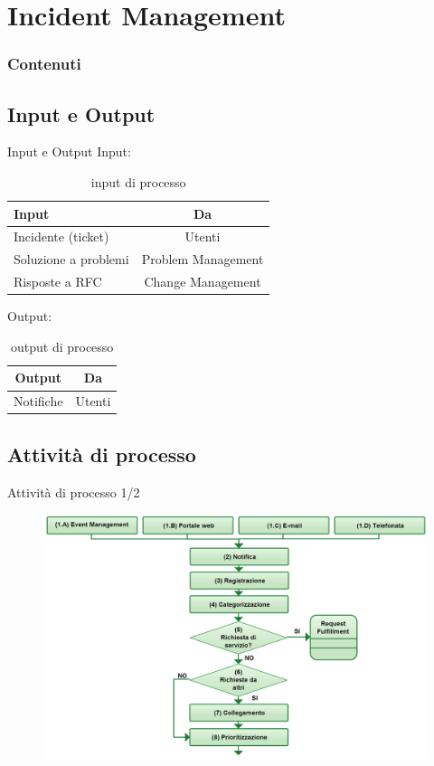 %
\section{Incident Management}
\frame
{
\frametitle{Contenuti}
\tableofcontents[currentsection]
}

\subsection*{Input e Output}
\begin{frame}{Input e Output}
Input:
\begin{table}
\begin{tabular}{ l | c }
\textbf{Input} & \textbf{Da}\\
\hline
Incidente (ticket) & Utenti\\
Soluzione a problemi & Problem Management\\
Risposte a RFC & Change Management\\
\end{tabular}
\caption{input di processo}
\end{table}
Output:
\begin{table}
\begin{tabular}{ c | c }
\textbf{Output} & \textbf{Da}\\
\hline
Notifiche & Utenti\\
\end{tabular}
\caption{output di processo}
\end{table}
\end{frame}

\subsection*{Attività di processo}
\begin{frame}{Attività di processo \small{1/2}}
\begin{figure}
\includegraphics[scale=0.22]{Images/Incident_management_1.png}
\end{figure}
\end{frame}

